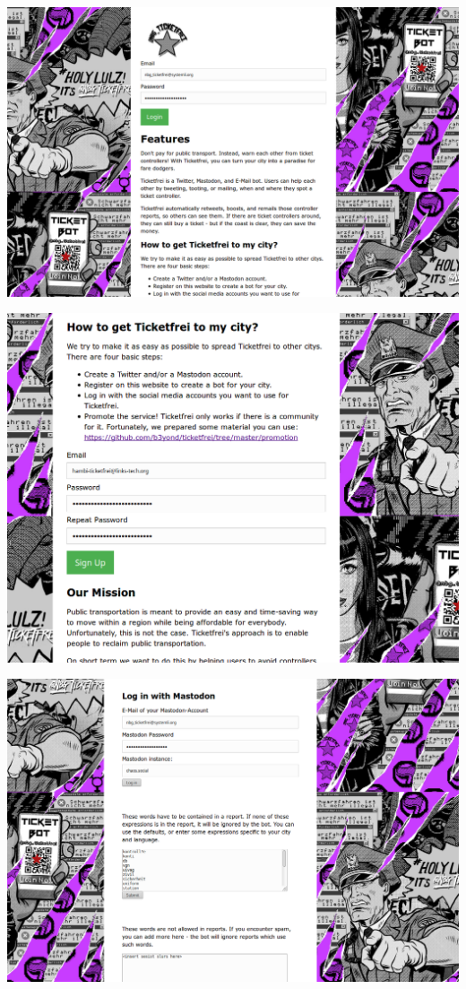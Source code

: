 \documentclass[10pt]{beamer}
\begin{document}
{\begin{frame}
	\includegraphics[width=\textwidth]{screenshots/Screenshot_2018-03-30_01-22-59.png}	
\end{frame}
\begin{frame}
	\includegraphics[width=\textwidth]{screenshots/Screenshot_2018-03-30_01-10-40.png}	
\end{frame}
\begin{frame}
	\includegraphics[width=\textwidth]{screenshots/Screenshot_2018-03-30_01-13-16.png}	
\end{frame}

}
\end{document}
